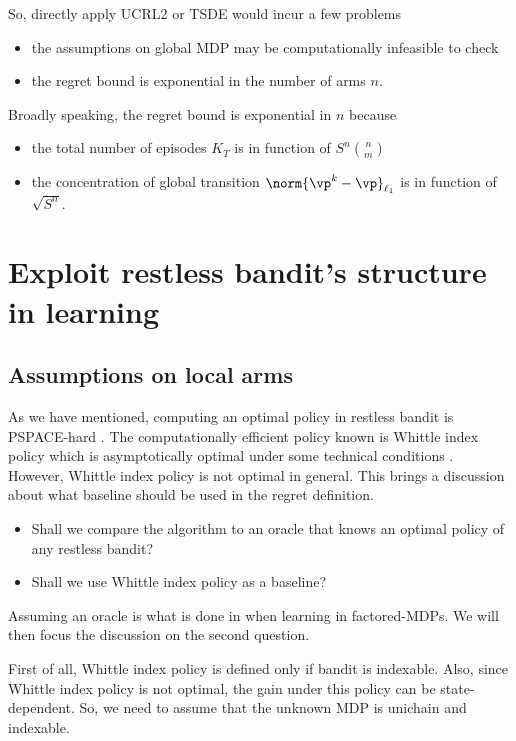 So, directly apply UCRL2 or TSDE would incur a few problems
\begin{itemize}
    \item the assumptions on global MDP may be computationally infeasible to check
    \item the regret bound is exponential in the number of arms $n$.
\end{itemize}
Broadly speaking, the regret bound is exponential in $n$ because
\begin{itemize}
    \item the total number of episodes $K_T$ is in function of $S^n{n \choose m}$
    \item the concentration of global transition $\norm{\vp^k-\vp}_{\ell_1}$ is in function of $\sqrt{S^n}$.
\end{itemize}

\section{Exploit restless bandit's structure in learning}
\label{ch:restless:sec:structure}

\subsection{Assumptions on local arms}

As we have mentioned, computing an optimal policy in restless bandit is PSPACE-hard \cite{papadimitriou1994complexity}.
The computationally efficient policy known is Whittle index policy which is asymptotically optimal under some technical conditions \cite{weber1990index}.
However, Whittle index policy is not optimal in general.
This brings a discussion about what baseline should be used in the regret definition.
\begin{itemize}
    \item Shall we compare the algorithm to an oracle that knows an optimal policy of any restless bandit?
    \item Shall we use Whittle index policy as a baseline?
\end{itemize}
Assuming an oracle is what is done in \cite{osband2014near, rosenberg2020oracle, xu2020reinforcement} when learning in factored-MDPs.
We will then focus the discussion on the second question.

First of all, Whittle index policy is defined only if bandit is indexable.
Also, since Whittle index policy is not optimal, the gain under this policy can be state-dependent.
So, we need to assume that the unknown MDP is unichain and indexable.


